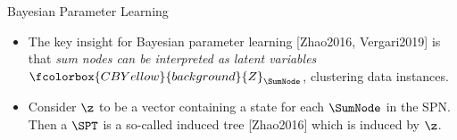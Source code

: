 
\begin{frame}{Bayesian Parameter Learning}
  \begin{itemize}
    \item The key insight for Bayesian parameter learning [Zhao2016, Vergari2019] is that \emph{sum nodes can be interpreted as latent variables} $\fcolorbox{CBYellow}{background}{Z}_\SumNode$, clustering data instances.
    \pause
    \item Consider $\z$ to be a vector containing a state for each $\SumNode$ in the SPN. Then a $\SPT$ is a so-called induced tree [Zhao2016] which is induced by $\z$.
  \end{itemize}
  \pause
  \begin{figure}
  \centering{
    
    }
\end{figure}
\end{frame}
%
%
%
%
%
%
%
%
%
%
%
%
%
%
%
%
%
%
%
%
%
%
%
